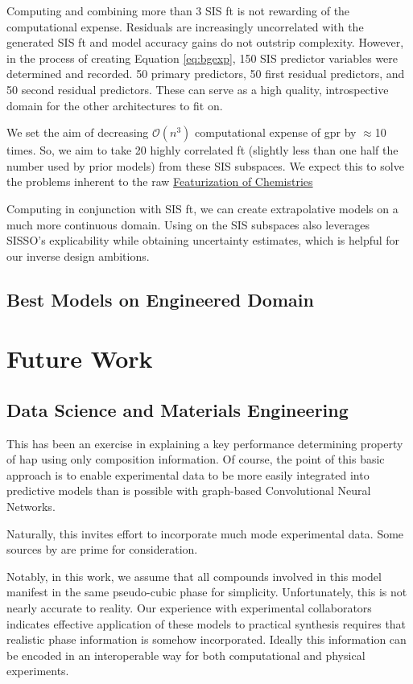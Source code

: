 \documentclass[aip, jmp, amsmath, amssymb, nofootinbib]{revtex4-2}
\begin{document}
Computing and combining more than 3 SIS \gls{ft} is not rewarding of
the computational expense. Residuals are increasingly uncorrelated
with the generated SIS \gls{ft} and model accuracy gains do not
outstrip complexity. However, in the process of creating Equation
\ref{eq:bgexp}, 150 SIS predictor variables were determined and
recorded. 50 primary predictors, 50 first residual predictors, and 50
second residual predictors. These can serve as a high quality,
introspective domain for the other architectures to fit on.

We set the aim of decreasing \(\mathcal{O}(n^3)\) computational
expense of \acrshort{gpr} by \(\approx\)10 times. So, we aim to take 20 highly
correlated \gls{ft} (slightly less than one half the number used by
prior models) from these SIS subspaces. We expect this to solve the
problems inherent to the raw \hyperref[sec:org6fe3a2d]{Featurization of Chemistries}

Computing  in conjunction with SIS \gls{ft}, we can create
extrapolative models on a much more continuous domain. Using  on
the SIS subspaces also leverages SISSO's explicability while obtaining
uncertainty estimates, which is helpful for our inverse design
ambitions.

\subsection*{Best Models on Engineered Domain}
\label{sec:org546cba0}
\section*{Future Work}
\label{sec:org007fe94}
\subsection*{Data Science and Materials Engineering}
\label{sec:orgd5e3b3f}
This has been an exercise in explaining a key performance determining
property of \Acrfull{hap} using only composition
information. Of course, the point of this basic approach is to enable
experimental data to be more easily integrated into predictive models
than is possible with graph-based Convolutional Neural Networks.

Naturally, this invites effort to incorporate much mode experimental
data. Some sources by
\citet{jacobsson-2021-open-acces,briones-2021-accel-lattic} are prime
for consideration.

Notably, in this work, we assume that all compounds involved in this
model manifest in the same pseudo-cubic phase for
simplicity. Unfortunately, this is not nearly accurate to reality. Our
experience with experimental collaborators indicates effective
application of these models to practical synthesis requires that
realistic phase information is somehow incorporated. Ideally this
information can be encoded in an interoperable way for both
computational and physical experiments.
\end{document}
